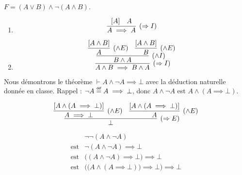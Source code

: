 \documentclass[12pt,french,a4paper]{article}
\newcommand\eqdef{\mathrel{\overset{\makebox[0pt]{\mbox{\normalfont\tiny\sffamily déf}}}{=}}}
\begin{document}
\begin{question}
$F = (A \vee B) \wedge \neg (A \wedge B).$
\end{question}

\begin{question}

\begin{enumerate}
\item
\[
\infer[(\Rightarrow{}I)] {A \implies A} {[A] & A}
\]

\item
\[
\infer[(\Rightarrow{}I)] {A\wedge B \implies B \wedge A} {
\infer[(\wedge I)] {B \wedge A} {
\infer[(\wedge E)] {A} {[A \wedge B]} & \infer[(\wedge E)] {B} {[A \wedge B]}
}
}
\]

\end{enumerate}
\end{question}

\begin{question}
Nous démontrons le théorème $\vdash A \wedge \neg A \implies \bot$ avec la déduction naturelle donnée en classe. Rappel : $\neg A \eqdef A \implies \bot$, donc $A \wedge \neg A$ est $A \wedge (A \implies \bot)$.

\[
\infer[(\Rightarrow{}E)] {\bot} {
\infer[(\wedge E)] {A \implies \bot} {[A \wedge (A \implies \bot)]} & \infer[(\wedge E)] {A} {[A \wedge (A \implies \bot)]}
}
\]


\end{question}

\newpage
\begin{question}

\begin{eqnarray*}
& \neg \neg (A \wedge \neg A) \\
\mbox{est} &\neg (A \wedge \neg A) \implies \bot \\
\mbox{est} & \big( (A \wedge \neg A) \implies \bot\big) \implies \bot \\
\mbox{est} & \Big( \big(A \wedge (A \implies \bot) \big) \implies \bot \Big) \implies \bot
\end{eqnarray*}

\end{question}
\end{document}
